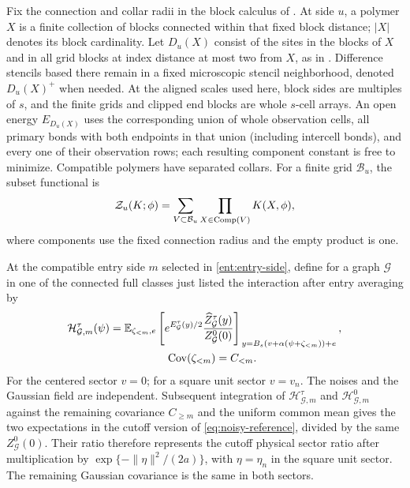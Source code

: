 Fix the connection and collar radii in the block calculus of
\cite[Section~4]{B}.  At side \(u\), a polymer \(X\) is a finite
collection of blocks connected within that fixed block distance;
\(|X|\) denotes its block cardinality.  Let \(D_u(X)\) consist of
the sites in the blocks of \(X\) and in all grid blocks at index
distance at most two from \(X\), as in \cite[Section~4]{B}.
Difference stencils based there remain in a fixed microscopic
stencil neighborhood, denoted \(D_u(X)^+\) when needed.  At the
aligned scales used here, block sides are multiples of \(s\), and
the finite grids and clipped end blocks are whole \(s\)-cell arrays.
An open energy \(E_{D_u(X)}\) uses the corresponding union of whole
observation cells, all primary bonds with both endpoints in that union
(including intercell bonds), and every one of their observation rows; each resulting
component constant is free to minimize.  Compatible polymers have
separated collars.  For a
finite grid \(\mathcal B_u\), the subset functional is
\begin{equation}\label{eq:subset-functional}
 \mathcal Z_u(K;\phi)=
 \sum_{V\subset\mathcal B_u}
       \prod_{X\in\operatorname{Comp}(V)}K(X,\phi),
\end{equation}
where components use the fixed connection radius and the empty
product is one.

At the compatible entry side \(m\) selected in
\eqref{ent:entry-side}, define for a graph \(\mathcal G\) in one of
the connected full classes just listed the interaction after entry averaging by
\begin{equation}\label{ent:averaged-interaction}
\begin{split}
 \mathcal H_{\mathcal G,m}^\tau(\psi)
 &=\E_{\zeta_{<m},e}
 \left[
   e^{E_{\mathcal G}^\tau(y)/2}
        \frac{\widehat Z_{\mathcal G}^\tau(y)}
             {Z_{\mathcal G}^0(0)}
 \right]_{\,y=B_s(v+\alpha(\psi+\zeta_{<m}))+e},\\
 &\hspace{18mm}\Cov(\zeta_{<m})=C_{<m}.
\end{split}
\end{equation}
For the centered sector \(v=0\); for a square unit sector \(v=v_n\).
The noises and the Gaussian field are independent.  Subsequent
integration of \(\mathcal H_{\mathcal G,m}^\tau\) and
\(\mathcal H_{\mathcal G,m}^0\) against the remaining covariance
\(C_{\ge m}\) and the uniform common mean gives the two expectations
in the cutoff version of \eqref{eq:noisy-reference}, divided by the
same \(Z_{\mathcal G}^0(0)\).  Their ratio therefore represents the
cutoff physical sector ratio after multiplication by
\(\exp\{-\|\eta\|^2/(2a)\}\), with \(\eta=\eta_n\) in the square
unit sector.  The remaining Gaussian covariance
is the same in both sectors.


